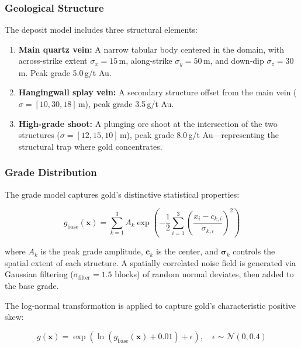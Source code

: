 \documentclass[12pt,a4paper]{article}
\begin{document}
\subsubsection{Geological Structure}

The deposit model includes three structural elements:

\begin{enumerate}
    \item \textbf{Main quartz vein:} A narrow tabular body centered in the domain, with across-strike extent $\sigma_x = 15$\,m, along-strike $\sigma_y = 50$\,m, and down-dip $\sigma_z = 30$\,m. Peak grade 5.0\,g/t Au.
    \item \textbf{Hangingwall splay vein:} A secondary structure offset from the main vein ($\sigma = [10, 30, 18]$\,m), peak grade 3.5\,g/t Au.
    \item \textbf{High-grade shoot:} A plunging ore shoot at the intersection of the two structures ($\sigma = [12, 15, 10]$\,m), peak grade 8.0\,g/t Au---representing the structural trap where gold concentrates.
\end{enumerate}

\subsubsection{Grade Distribution}

The grade model captures gold's distinctive statistical properties:

\begin{equation}
    g_{\text{base}}(\mathbf{x}) = \sum_{k=1}^{3} A_k \exp\left(-\frac{1}{2} \sum_{i=1}^{3} \left(\frac{x_i - c_{k,i}}{\sigma_{k,i}}\right)^2 \right)
\end{equation}

where $A_k$ is the peak grade amplitude, $\mathbf{c}_k$ is the center, and $\boldsymbol{\sigma}_k$ controls the spatial extent of each structure. A spatially correlated noise field is generated via Gaussian filtering ($\sigma_{\text{filter}} = 1.5$ blocks) of random normal deviates, then added to the base grade.

The log-normal transformation is applied to capture gold's characteristic positive skew:

\begin{equation}
    g(\mathbf{x}) = \exp\left(\ln(g_{\text{base}}(\mathbf{x}) + 0.01) + \epsilon \right), \quad \epsilon \sim \mathcal{N}(0, 0.4)
\end{equation}
\end{document}

